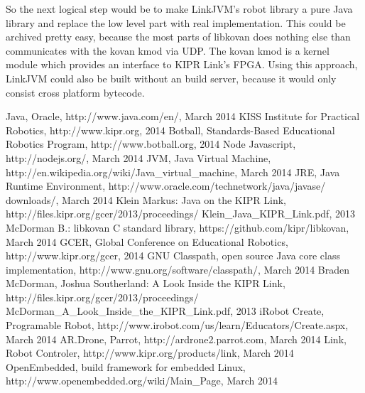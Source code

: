 \documentclass{juniorjournal}
\begin{document}
So the next logical step would be to make LinkJVM's robot library a pure Java\cite{Java} library and replace the low level part with real implementation.
This could be archived pretty easy, because the most parts of libkovan\cite{libkovan} does nothing else than communicates with the kovan kmod via UDP. 
The kovan kmod is a kernel module which provides an interface to KIPR\cite{KIPR} Link's\cite{link} FPGA.
Using this approach, LinkJVM could also be built without an build server, because it would only consist cross platform bytecode. 

\begin{thebibliography}{500} %
  Java, Oracle,
  http://www.java.com/en/, March 2014
  KISS Institute for Practical Robotics,
  http://www.kipr.org, 2014
  Botball, Standards-Based Educational Robotics Program, 
  http://www.botball.org, 2014
  Node Javascript, 
  http://nodejs.org/, March 2014
  JVM, Java Virtual Machine,
  http://en.wikipedia.org/wiki/Java\_virtual\_machine, March 2014
  JRE, Java Runtime Environment, 
  http://www.oracle.com/technetwork/java/javase/
  downloads/, March 2014
  Klein Markus: \frqq Java on the KIPR Link\flqq  ,
  http://files.kipr.org/gcer/2013/proceedings/
  Klein\_Java\_KIPR\_Link.pdf, 2013
  McDorman B.: libkovan C standard library,
  https://github.com/kipr/libkovan, March 2014
  GCER, Global Conference on Educational Robotics,
  http://www.kipr.org/gcer, 2014
  GNU Classpath, open source Java core class implementation,
  http://www.gnu.org/software/classpath/, March 2014
  Braden McDorman, Joshua Southerland: \frqq A Look Inside the KIPR Link\flqq  ,
  http://files.kipr.org/gcer/2013/proceedings/
  McDorman\_A\_Look\_Inside\_the\_KIPR\_Link.pdf, 2013
  iRobot Create, Programable Robot,
  http://www.irobot.com/us/learn/Educators/Create.aspx, March 2014
  AR.Drone, Parrot,
  http://ardrone2.parrot.com, March 2014
  Link, Robot Controler,
  http://www.kipr.org/products/link, March 2014
  OpenEmbedded, build framework for embedded Linux,
  http://www.openembedded.org/wiki/Main\_Page, March 2014
\end{thebibliography}
\end{document}
